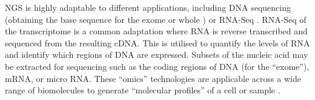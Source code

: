 
\gls{NGS} is highly adaptable to different applications, including \acrshort{DNA} sequencing (obtaining the base sequence for the exome or whole ) or \gls{RNA-Seq} \citep{Waldron2016, Goodwin2016, Tran2012}. %
\gls{RNA-Seq} of the \gls{transcriptome} is a common adaptation where \acrshort{RNA} is reverse transcribed and sequenced from the resulting \gls{cDNA}. This is utilised to quantify the levels of \acrshort{RNA} and identify which regions of \acrshort{DNA} are expressed. 
Subsets of the nucleic acid may be extracted for sequencing such as the coding regions of \acrshort{DNA} (for the ``exome''),  %
mRNA,  %
or micro RNA. %
These ``\gls{omics}'' technologies \citep{Roychowdhury2016, Waldron2016} are applicable across a wide range of biomolecules to generate ``\glspl{molecular profile}'' of a cell or sample \citep{Perou2000}. %

